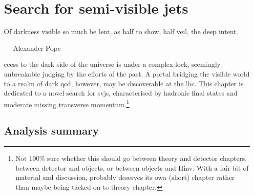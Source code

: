\chapter{Search for semi-visible jets}  %
\label{chap:svj}

\epigraph{Of darkness visible so much be lent, as half to show, half veil, the deep intent.}{--- Alexander Pope}

ccess to the dark side of the universe is under a complex lock, seemingly unbreakable judging by the efforts of the past. A portal bridging the visible world to a realm of dark \acrshort{qcd}, however, may be discoverable at the \acrshort{lhc}. This chapter is dedicated to a novel search for \glspl{svj}, characterised by hadronic final states and moderate missing transverse momentum.\footnote{Not 100\% sure whether this should go between theory and detector chapters, between detector and objects, or between objects and Hinv. With a fair bit of material and discussion, probably deserves its own (short) chapter rather than maybe being tacked on to theory chapter.}






\section{Analysis summary}
\label{sec:svj_overview}

